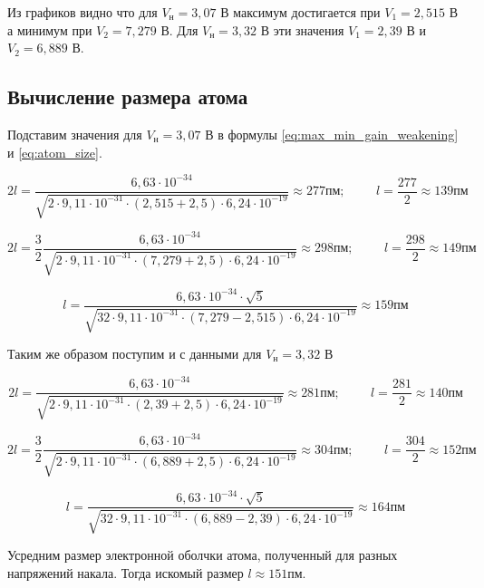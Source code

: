 \documentclass[12pt]{article}
\begin{document}
      Из графиков видно что для $V_н = 3,07$ В максимум достигается при
      $V_1 = 2,515$ В а минимум при $V_2 = 7,279$ В.
      Для $V_н = 3,32$ В эти значения $V_1 = 2,39$ В и $V_2 = 6,889$ В.

    \subsection{Вычисление размера атома}

      Подставим значения для $V_н = 3,07$ В в формулы
      \ref{eq:max_min_gain_weakening} и \ref{eq:atom_size}.

      $$
        2 l = \frac{6,63 \cdot 10^{-34}}{\sqrt{2 \cdot 9,11 \cdot 10^{-31} \cdot
        \left( 2,515 + 2,5 \right) \cdot 6,24 \cdot 10^{-19}}} \approx 277 пм;
        \hspace{1cm} l = \frac{277}{2} \approx 139 пм
      $$

      $$
        2 l = \frac{3}{2} \frac{6,63 \cdot 10^{-34}}{\sqrt{2 \cdot 9,11 \cdot
        10^{-31} \cdot \left( 7,279 + 2,5 \right) \cdot 6,24 \cdot 10^{-19}}}
        \approx 298 пм; \hspace{1cm} l = \frac{298}{2} \approx 149 пм
      $$

      $$
        l = \frac{6,63 \cdot 10^{-34} \cdot \sqrt{5}}{\sqrt{32 \cdot 9,11 \cdot
        10^{-31} \cdot \left( 7,279 - 2,515 \right) \cdot 6,24 \cdot 10^{-19}}}
        \approx 159 пм
      $$

      Таким же образом поступим и с данными для $V_н = 3,32$ В

      $$
        2 l = \frac{6,63 \cdot 10^{-34}}{\sqrt{2 \cdot 9,11 \cdot 10^{-31} \cdot
        \left( 2,39 + 2,5 \right) \cdot 6,24 \cdot 10^{-19}}} \approx 281 пм;
        \hspace{1cm} l = \frac{281}{2} \approx 140 пм
      $$

      $$
        2 l = \frac{3}{2} \frac{6,63 \cdot 10^{-34}}{\sqrt{2 \cdot 9,11 \cdot
        10^{-31} \cdot \left( 6,889 + 2,5 \right) \cdot 6,24 \cdot 10^{-19}}}
        \approx 304 пм; \hspace{1cm} l = \frac{304}{2} \approx 152 пм
      $$

      $$
        l = \frac{6,63 \cdot 10^{-34} \cdot \sqrt{5}}{\sqrt{32 \cdot 9,11 \cdot
        10^{-31} \cdot \left( 6,889 - 2,39 \right) \cdot 6,24 \cdot 10^{-19}}}
        \approx 164 пм
      $$

      Усредним размер электронной оболчки атома, полученный для разных
      напряжений накала. Тогда искомый размер $l \approx 151 пм$.
\end{document}

